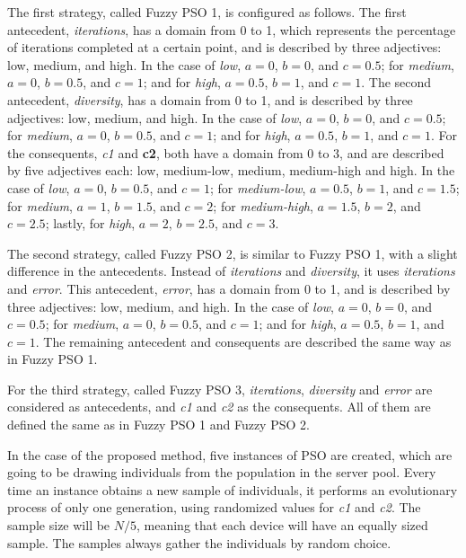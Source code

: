 The first strategy, called Fuzzy PSO 1, is configured as follows. The first antecedent, \textit{iterations}, has a domain from 0 to 1, which represents the percentage of iterations completed at a certain point, and is described by three adjectives: low, medium, and high. In the case of \textit{low}, $a = 0$, $b = 0$, and $c = 0.5$; for \textit{medium}, $a = 0$, $b = 0.5$, and $c = 1$; and for \textit{high}, $a = 0.5$, $b = 1$, and $c = 1$. The second antecedent, \textit{diversity}, has a domain from 0 to 1, and is described by three adjectives: low, medium, and high. In the case of \textit{low}, $a = 0$, $b = 0$, and $c = 0.5$; for \textit{medium}, $a = 0$, $b = 0.5$, and $c = 1$; and for \textit{high}, $a = 0.5$, $b = 1$, and $c = 1$. For the consequents, \textit{c1} and \textbf{c2}, both have a domain from 0 to 3, and are described by five adjectives each: low, medium-low, medium, medium-high and high. In the case of \textit{low}, $a = 0$, $b = 0.5$, and $c = 1$; for \textit{medium-low}, $a = 0.5$, $b = 1$, and $c = 1.5$; for \textit{medium}, $a = 1$, $b = 1.5$, and $c = 2$; for \textit{medium-high}, $a = 1.5$, $b = 2$, and $c = 2.5$; lastly, for \textit{high}, $a = 2$, $b = 2.5$, and $c = 3$.

The second strategy, called Fuzzy PSO 2, is similar to Fuzzy PSO 1, with a slight difference in the antecedents. Instead of \textit{iterations} and \textit{diversity}, it uses \textit{iterations} and \textit{error}. This antecedent, \textit{error}, has a domain from 0 to 1, and is described by three adjectives: low, medium, and high. In the case of \textit{low}, $a = 0$, $b = 0$, and $c = 0.5$; for \textit{medium}, $a = 0$, $b = 0.5$, and $c = 1$; and for \textit{high}, $a = 0.5$, $b = 1$, and $c = 1$. The remaining antecedent and consequents are described the same way as in Fuzzy PSO 1.

For the third strategy, called Fuzzy PSO 3, \textit{iterations}, \textit{diversity} and \textit{error} are considered as antecedents, and \textit{c1} and \textit{c2} as the consequents. All of them are defined the same as in Fuzzy PSO 1 and Fuzzy PSO 2.



In the case of the proposed method, five instances of PSO are created, which are going to be drawing individuals from the population in the server pool. Every time an instance obtains a new sample of individuals, it performs an evolutionary process of only one generation, using randomized values for \textit{c1} and \textit{c2}. The sample size will be $N/5$, meaning that each device will have an equally sized sample. The samples always gather the individuals by random choice.

